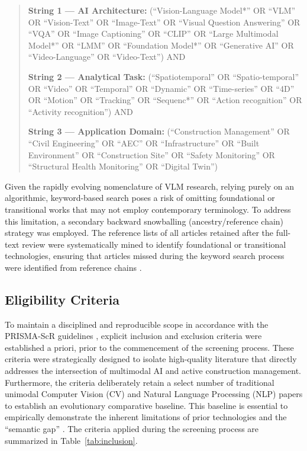 \documentclass[10pt,letterpaper]{article}
\begin{document}
\begin{quote}
\textbf{String 1 --- AI Architecture:} (``Vision-Language Model*'' OR ``VLM'' OR ``Vision-Text'' OR ``Image-Text'' OR ``Visual Question Answering'' OR ``VQA'' OR ``Image Captioning'' OR ``CLIP'' OR ``Large Multimodal Model*'' OR ``LMM'' OR ``Foundation Model*'' OR ``Generative AI'' OR ``Video-Language'' OR ``Video-Text'') AND

\textbf{String 2 --- Analytical Task:} (``Spatiotemporal'' OR ``Spatio-temporal'' OR ``Video'' OR ``Temporal'' OR ``Dynamic'' OR ``Time-series'' OR ``4D'' OR ``Motion'' OR ``Tracking'' OR ``Sequenc*'' OR ``Action recognition'' OR ``Activity recognition'') AND

\textbf{String 3 --- Application Domain:} (``Construction Management'' OR ``Civil Engineering'' OR ``AEC'' OR ``Infrastructure'' OR ``Built Environment'' OR ``Construction Site'' OR ``Safety Monitoring'' OR ``Structural Health Monitoring'' OR ``Digital Twin'')
\end{quote}

Given the rapidly evolving nomenclature of VLM research, relying purely on an algorithmic, keyword-based search poses a risk of omitting foundational or transitional works that may not employ contemporary terminology. To address this limitation, a secondary backward snowballing (ancestry/reference chain) strategy was employed. The reference lists of all articles retained after the full-text review were systematically mined to identify foundational or transitional technologies, ensuring that articles missed during the keyword search process were identified from reference chains \cite{rabbi2024}.

\subsection{Eligibility Criteria}

To maintain a disciplined and reproducible scope in accordance with the PRISMA-ScR guidelines \cite{tricco2018}, explicit inclusion and exclusion criteria were established a priori, prior to the commencement of the screening process. These criteria were strategically designed to isolate high-quality literature that directly addresses the intersection of multimodal AI and active construction management. Furthermore, the criteria deliberately retain a select number of traditional unimodal Computer Vision (CV) and Natural Language Processing (NLP) papers to establish an evolutionary comparative baseline. This baseline is essential to empirically demonstrate the inherent limitations of prior technologies and the ``semantic gap'' \cite{wu2021}. The criteria applied during the screening process are summarized in Table~\ref{tab:inclusion}.
\end{document}
